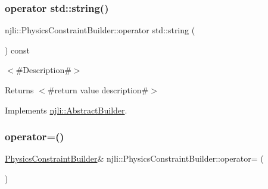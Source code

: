 \subsubsection{\texorpdfstring{operator std\+::string()}{operator std::string()}}
{\footnotesize\ttfamily njli\+::\+Physics\+Constraint\+Builder\+::operator std\+::string (\begin{DoxyParamCaption}{ }\end{DoxyParamCaption}) const\hspace{0.3cm}{\ttfamily [virtual]}}

$<$\#\+Description\#$>$

\begin{DoxyReturn}{Returns}
$<$\#return value description\#$>$ 
\end{DoxyReturn}


Implements \mbox{\hyperlink{classnjli_1_1_abstract_builder_a3e6e553e06d1ca30517ad5fb0bd4d000}{njli\+::\+Abstract\+Builder}}.

\mbox{\label{classnjli_1_1_physics_constraint_builder_a78e92834a688b68081a11edd48b5641a}} 
\subsubsection{\texorpdfstring{operator=()}{operator=()}}
{\footnotesize\ttfamily \mbox{\hyperlink{classnjli_1_1_physics_constraint_builder}{Physics\+Constraint\+Builder}}\& njli\+::\+Physics\+Constraint\+Builder\+::operator= (\begin{DoxyParamCaption}\item[{const \mbox{\hyperlink{classnjli_1_1_physics_constraint_builder}{Physics\+Constraint\+Builder}} \&}]{ }\end{DoxyParamCaption})\hspace{0.3cm}{\ttfamily [protected]}}

\mbox{\label{classnjli_1_1_physics_constraint_builder_a150e376adfc9bc332f2b53073bc565c8}} 
